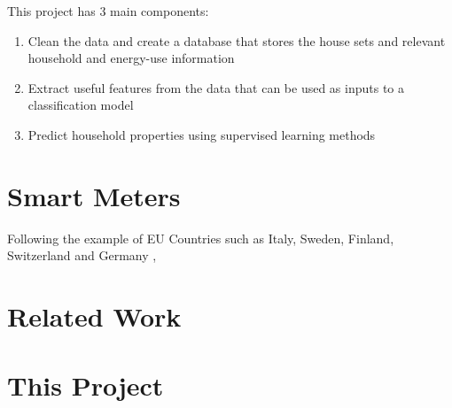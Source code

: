 This project has 3 main components:

\begin{enumerate}
\item Clean the data and create a database that stores the house sets and relevant household and energy-use information
\item Extract useful features from the data that can be used as inputs to a classification model 
\item Predict household properties using supervised learning methods
\end{enumerate}
\section{Smart Meters}
Following the example of EU Countries such as Italy, Sweden, Finland, Switzerland and Germany \cite{OfGEM}\cite{Vasc}, 
\section{Related Work}
\section{This Project}
